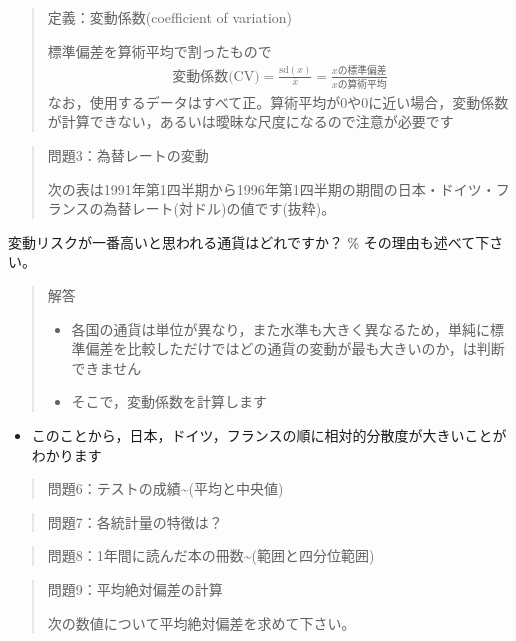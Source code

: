 \documentclass[
]{book}
\providecommand{\tightlist}{%
  \setlength{\itemsep}{0pt}\setlength{\parskip}{0pt}}
\theoremstyle{definition}
\theoremstyle{definition}
\theoremstyle{definition}
\theoremstyle{definition}
\theoremstyle{remark}
\begin{document}
\begin{quote}
定義：変動係数(coefficient of variation)

標準偏差を算術平均で割ったもので
\begin{align*}
\text{変動係数(CV)}=\frac{\text{sd}(x)}{\bar{x}}=\frac{x\text{の標準偏差}}{x\text{の算術平均}}
\end{align*}
なお，使用するデータはすべて正。算術平均が0や0に近い場合，変動係数が計算できない，あるいは曖昧な尺度になるので注意が必要です
\end{quote}

\begin{quote}
問題3：為替レートの変動

次の表は1991年第1四半期から1996年第1四半期の期間の日本・ドイツ・フランスの為替レート(対ドル)の値です(抜粋)。
\end{quote}

変動リスクが一番高いと思われる通貨はどれですか？ \% その理由も述べて下さい。

\begin{quote}
解答

\begin{itemize}
\tightlist
\item
  各国の通貨は単位が異なり，また水準も大きく異なるため，単純に標準偏差を比較しただけではどの通貨の変動が最も大きいのか，は判断できません
\item
  そこで，変動係数を計算します
\end{itemize}
\end{quote}

\begin{itemize}
\tightlist
\item
  このことから，日本，ドイツ，フランスの順に相対的分散度が大きいことがわかります
\end{itemize}

\begin{quote}
問題6：テストの成績\textasciitilde(平均と中央値)
\end{quote}

\begin{quote}
問題7：各統計量の特徴は？
\end{quote}

\begin{quote}
問題8：1年間に読んだ本の冊数\textasciitilde(範囲と四分位範囲)
\end{quote}

\begin{quote}
問題9：平均絶対偏差の計算

次の数値について平均絶対偏差を求めて下さい。
\end{quote}
\end{document}
